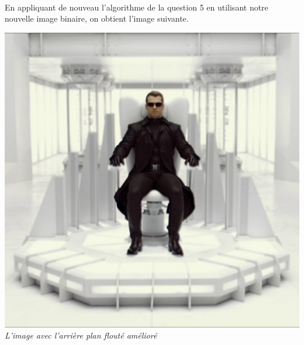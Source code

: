 \documentclass[a4paper,11pt]{article}
\begin{document}
\paragraph{} En appliquant de nouveau l'algorithme de la question 5 en utilisant notre nouvelle image binaire, on obtient l'image suivante.
\begin{center}
\includegraphics[scale=0.7]{weskerfondfloumieux.png}\\
\textit{L'image avec l'arrière plan flouté amélioré}
\end{center}
\end{document}
